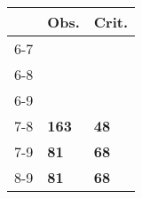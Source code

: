 \begin{table}[ht]
\centering
\begin{tabular}{rll}
  \hline
 & Obs. & Crit. \\ 
  \hline
6-7 &  &  \\ 
  6-8 &  &  \\ 
  6-9 &  &  \\ 
  7-8 & \textbf{163} & \textbf{48} \\ 
  7-9 & \textbf{81} & \textbf{68} \\ 
  8-9 & \textbf{81} & \textbf{68} \\ 
   \hline
\end{tabular}
\end{table}
